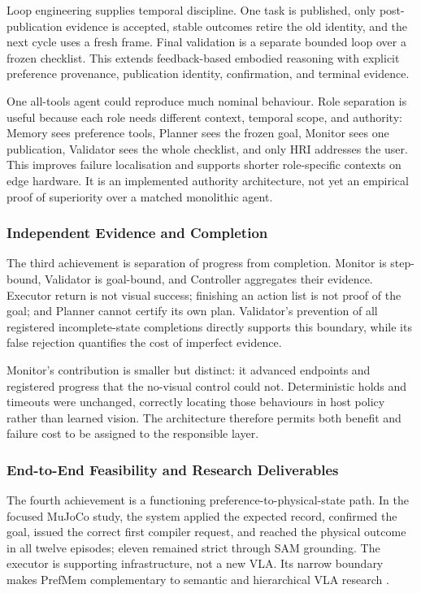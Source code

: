 Loop engineering supplies temporal discipline. One task is published, only
post-publication evidence is accepted, stable outcomes retire the old identity,
and the next cycle uses a fresh frame. Final validation is a separate bounded
loop over a frozen checklist. This extends feedback-based embodied reasoning
\parencite{ahn2022saycan,huang2022innermonologue,yao2023react} with explicit
preference provenance, publication identity, confirmation, and terminal
evidence.

One all-tools agent could reproduce much nominal behaviour. Role separation is
useful because each role needs different context, temporal scope, and authority:
Memory sees preference tools, Planner sees the frozen goal, Monitor sees one
publication, Validator sees the whole checklist, and only HRI addresses the
user. This improves failure localisation and supports shorter role-specific
contexts on edge hardware. It is an implemented authority architecture, not yet
an empirical proof of superiority over a matched monolithic agent.

\subsubsection{Independent Evidence and Completion}

The third achievement is separation of progress from completion. Monitor is
step-bound, Validator is goal-bound, and Controller aggregates their evidence.
Executor return is not visual success; finishing an action list is not proof of
the goal; and Planner cannot certify its own plan. Validator's prevention of all
registered incomplete-state completions directly supports this boundary, while
its false rejection quantifies the cost of imperfect evidence.

Monitor's contribution is smaller but distinct: it advanced endpoints and
registered progress that the no-visual control could not. Deterministic holds
and timeouts were unchanged, correctly locating those behaviours in host policy
rather than learned vision. The architecture therefore permits both benefit and
failure cost to be assigned to the responsible layer.

\subsubsection{End-to-End Feasibility and Research Deliverables}

The fourth achievement is a functioning preference-to-physical-state path. In
the focused MuJoCo study, the system applied the expected record, confirmed the
goal, issued the correct first compiler request, and reached the physical outcome
in all twelve episodes; eleven remained strict through SAM grounding. The
executor is supporting infrastructure, not a new VLA. Its narrow boundary makes
PrefMem complementary to semantic and hierarchical VLA research
\parencite{ni2026semanticvla,shi2025hirobot,yang2025agenticrobot,li2026roboclaw}.

